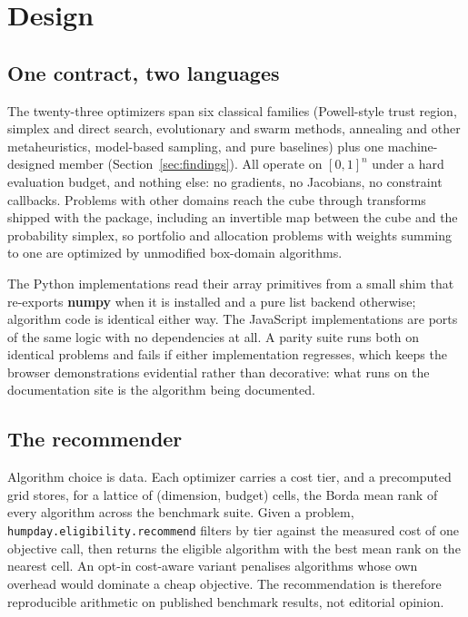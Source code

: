 \documentclass[article]{jss}
\providecommand{\proglang}[1]{\textsf{#1}}
\providecommand{\pkg}[1]{\textbf{#1}}
\providecommand{\code}[1]{\texttt{#1}}
\begin{document}
\section{Design} \label{sec:design}

\subsection{One contract, two languages}

The twenty-three optimizers span six classical families (Powell-style trust
region, simplex and direct search, evolutionary and swarm methods,
annealing and other metaheuristics, model-based sampling, and pure
baselines) plus one machine-designed member
(Section~\ref{sec:findings}). All operate on $[0,1]^n$ under a hard
evaluation budget, and nothing else: no gradients, no Jacobians, no
constraint callbacks. Problems with other domains reach the cube through
transforms shipped with the package, including an invertible map between
the cube and the probability simplex, so portfolio and allocation problems
with weights summing to one are optimized by unmodified box-domain
algorithms.

The \proglang{Python} implementations read their array primitives from a
small shim that re-exports \pkg{numpy} when it is installed and a pure list
backend otherwise; algorithm code is identical either way. The
\proglang{JavaScript} implementations are ports of the same logic with no
dependencies at all. A parity suite runs both on identical problems and
fails if either implementation regresses, which keeps the browser
demonstrations evidential rather than decorative: what runs on the
documentation site is the algorithm being documented.

\subsection{The recommender}

Algorithm choice is data. Each optimizer carries a cost tier, and a
precomputed grid stores, for a lattice of (dimension, budget) cells, the
Borda mean rank of every algorithm across the benchmark suite. Given a
problem, \code{humpday.eligibility.recommend} filters by tier against the
measured cost of one objective call, then returns the eligible algorithm
with the best mean rank on the nearest cell. An opt-in cost-aware variant
penalises algorithms whose own overhead would dominate a cheap objective.
The recommendation is therefore reproducible arithmetic on published
benchmark results, not editorial opinion.
\end{document}
